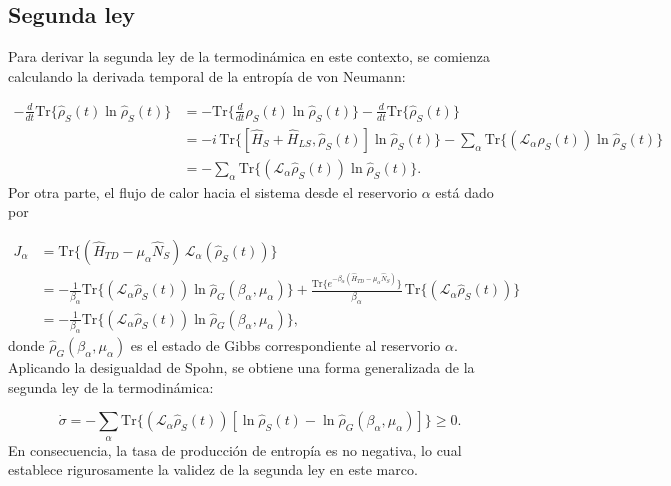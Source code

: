 \begin{appendixs}

\subsection{Segunda ley}

Para derivar la segunda ley de la termodinámica en este contexto, se comienza calculando la derivada temporal de la entropía de von Neumann:

\begin{align*}
    - \frac{d}{dt}\text{Tr}\{\hat{\rho}_{S}(t)\ln \hat{\rho}_{S}(t)\} 
    &=  -\text{Tr}\Big\{ \frac{d}{dt}\hat{\rho}_{S}(t)\ln \hat{\rho}_{S}(t) \Big\} - \frac{d}{dt}\text{Tr}\{\hat{\rho}_{S}(t)\} \\
    &= - i \,\text{Tr}\{[\hat{H}_{S}+\hat{H}_{LS},\hat{\rho}_{S}(t)]\ln \hat{\rho}_{S}(t)\} 
    - \sum_{\alpha} \text{Tr}\{(\mathcal{L}_{\alpha}\hat{\rho}_{S}(t)) \ln \hat{\rho}_{S}(t)\}  \\
    &= -\sum_{\alpha}\text{Tr}\{(\mathcal{L}_{\alpha}\hat{\rho}_{S}(t)) \ln \hat{\rho}_{S}(t)\}.
\end{align*}
Por otra parte, el flujo de calor hacia el sistema desde el reservorio $\alpha$ está dado por

\begin{align*}
    J_{\alpha} 
    &= \text{Tr}\{ (\hat{H}_{TD} - \mu_{\alpha}\hat{N}_{S})\,\mathcal{L}_{\alpha}(\hat{\rho}_{S}(t)) \} \\
    &= -\frac{1}{\beta_{\alpha}} \text{Tr}\{(\mathcal{L}_{\alpha}\hat{\rho}_{S}(t)) \ln \hat{\rho}_{G}(\beta_{\alpha},\mu_{\alpha}) \} 
    + \frac{\text{Tr}\{e^{-\beta_{\alpha}(\hat{H}_{TD} - \mu_{\alpha}\hat{N}_{S})}\}}{\beta_{\alpha}} \,\text{Tr}\{(\mathcal{L}_{\alpha}\hat{\rho}_{S}(t))\} \\
    &= -\frac{1}{\beta_{\alpha}} \text{Tr}\{(\mathcal{L}_{\alpha}\hat{\rho}_{S}(t))\ln \hat{\rho}_{G}(\beta_{\alpha},\mu_{\alpha}) \},
\end{align*}
donde $\hat{\rho}_{G}(\beta_{\alpha},\mu_{\alpha})$ es el estado de Gibbs correspondiente al reservorio $\alpha$.
\\

Aplicando la desigualdad de Spohn, se obtiene una forma generalizada de la segunda ley de la termodinámica:

\begin{equation*}
    \dot{\sigma} = - \sum_{\alpha} \text{Tr}\{(\mathcal{L}_{\alpha}\hat{\rho}_{S}(t)) [\ln \hat{\rho}_{S}(t) - \ln \hat{\rho}_{G}(\beta_{\alpha},\mu_{\alpha})] \} \geq 0.
\end{equation*}
En consecuencia, la tasa de producción de entropía es no negativa, lo cual establece rigurosamente la validez de la segunda ley en este marco.
\label{apendix:thermolaws}


\end{appendixs}
